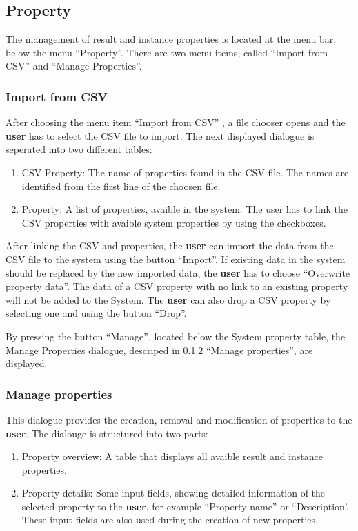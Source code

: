 \subsection{Property}
The management of result and instance properties is located at the menu bar, below the menu ``Property''. There are two menu items, called ``Import from CSV'' and ``Manage Properties''.

\subsubsection{Import from CSV}
After choosing the menu item ``Import from CSV'' , a file chooser opens and the \textbf{user} has to select the CSV file to import. The next displayed dialogue is seperated into two  different tables:
\begin{enumerate}
	\item CSV Property: The name of properties found in the CSV file. The names are identified from the first line of the choosen file.
	\item \edacc Property: A list of properties, avaible in the system. The user has to link the CSV properties with avaible system properties by using the checkboxes. 
\end{enumerate}

After linking the CSV and \edacc properties, the \textbf{user} can import the data from the CSV file to the system using the button ``Import''. If existing data in the system should be replaced by the new imported data, the \textbf{user} has to choose ``Overwrite property data''.
\attention The data of a CSV property with no link to an existing property will not be added to the System. The \textbf{user} can also drop a CSV property by selecting one and using the button ``Drop''.

By pressing the button ``Manage'', located below the System property table, the Manage Properties dialogue, descriped in \ref{mangageProperties} ``Manage properties'', are displayed.

\subsubsection{Manage properties} \label{mangageProperties} 
This dialogue provides  the creation, removal and modification of properties to the \textbf{user}. The dialouge is structured into two parts:
\begin{enumerate}
	\item Property overview: A table that displays all avaible result and instance properties.
	\item Property details: Some input fields, showing detailed information of the selected property to the \textbf{user}, for example ``Property name'' or ``Description'. These input fields are also used during the creation of new properties. 
\end{enumerate}

